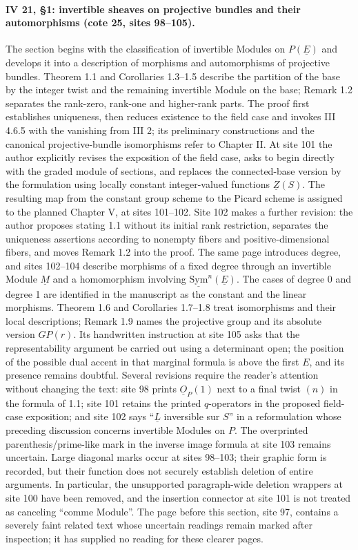 \paragraph{IV 21, \S 1: invertible sheaves on projective bundles and their automorphisms (cote 25, sites 98--105).}
The section begins with the classification of invertible Modules on $P(\underline E)$ and develops it into a description of morphisms and automorphisms of projective bundles. Theorem 1.1 and Corollaries 1.3--1.5 describe the partition of the base by the integer twist and the remaining invertible Module on the base; Remark 1.2 separates the rank-zero, rank-one and higher-rank parts. The proof first establishes uniqueness, then reduces existence to the field case and invokes III 4.6.5 with the vanishing from III 2; its preliminary constructions and the canonical projective-bundle isomorphisms refer to Chapter II. At site 101 the author explicitly revises the exposition of the field case, asks to begin directly with the graded module of sections, and replaces the connected-base version by the formulation using locally constant integer-valued functions $\underline Z(S)$. The resulting map from the constant group scheme to the Picard scheme is assigned to the planned Chapter V, at sites 101--102. Site 102 makes a further revision: the author proposes stating 1.1 without its initial rank restriction, separates the uniqueness assertions according to nonempty fibers and positive-dimensional fibers, and moves Remark 1.2 into the proof. The same page introduces degree, and sites 102--104 describe morphisms of a fixed degree through an invertible Module $\underline M$ and a homomorphism involving $\underline{\mathrm{Sym}}^n(\underline E)$. The cases of degree 0 and degree 1 are identified in the manuscript as the constant and the linear morphisms. Theorem 1.6 and Corollaries 1.7--1.8 treat isomorphisms and their local descriptions; Remark 1.9 names the projective group and its absolute version $GP(r)$. Its handwritten instruction at site 105 asks that the representability argument be carried out using a determinant open; the position of the possible dual accent in that marginal formula is above the first $E$, and its presence remains doubtful. Several revisions require the reader's attention without changing the text: site 98 prints $\underline O_P(1)$ next to a final twist $(n)$ in the formula of 1.1; site 101 retains the printed $q$-operators in the proposed field-case exposition; and site 102 says ``$\underline L$ inversible sur $S$'' in a reformulation whose preceding discussion concerns invertible Modules on $P$. The overprinted parenthesis/prime-like mark in the inverse image formula at site 103 remains uncertain. Large diagonal marks occur at sites 98--103; their graphic form is recorded, but their function does not securely establish deletion of entire arguments. In particular, the unsupported paragraph-wide deletion wrappers at site 100 have been removed, and the insertion connector at site 101 is not treated as canceling ``comme Module''. The page before this section, site 97, contains a severely faint related text whose uncertain readings remain marked after inspection; it has supplied no reading for these clearer pages.
